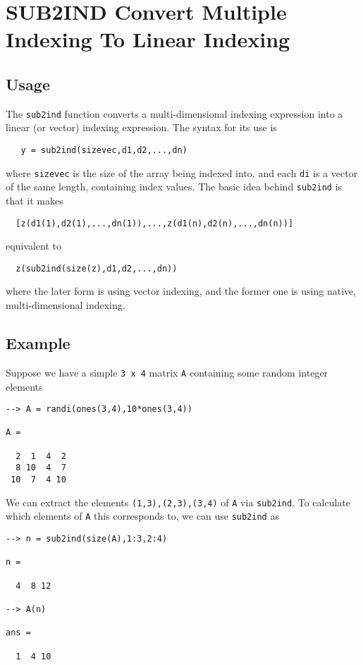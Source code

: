 \section{SUB2IND Convert Multiple Indexing To Linear Indexing}

\subsection{Usage}

The \verb|sub2ind| function converts a multi-dimensional indexing expression
into a linear (or vector) indexing expression.  The syntax for its use
is
\begin{verbatim}
   y = sub2ind(sizevec,d1,d2,...,dn)
\end{verbatim}
where \verb|sizevec| is the size of the array being indexed into, and each
\verb|di| is a vector of the same length, containing index values.  The basic
idea behind \verb|sub2ind| is that it makes
\begin{verbatim}
  [z(d1(1),d2(1),...,dn(1)),...,z(d1(n),d2(n),...,dn(n))]
\end{verbatim}
equivalent to
\begin{verbatim}
  z(sub2ind(size(z),d1,d2,...,dn))
\end{verbatim}
where the later form is using vector indexing, and the former one is using
native, multi-dimensional indexing.
\subsection{Example}

Suppose we have a simple \verb|3 x 4| matrix \verb|A| containing some random integer
elements
\begin{verbatim}
--> A = randi(ones(3,4),10*ones(3,4))

A = 

  2  1  4  2 
  8 10  4  7 
 10  7  4 10 
\end{verbatim}
We can extract the elements \verb|(1,3),(2,3),(3,4)| of \verb|A| via \verb|sub2ind|.
To calculate which elements of \verb|A| this corresponds to, we can use
\verb|sub2ind| as
\begin{verbatim}
--> n = sub2ind(size(A),1:3,2:4)

n = 

  4  8 12 

--> A(n)

ans = 

  1  4 10 
\end{verbatim}

